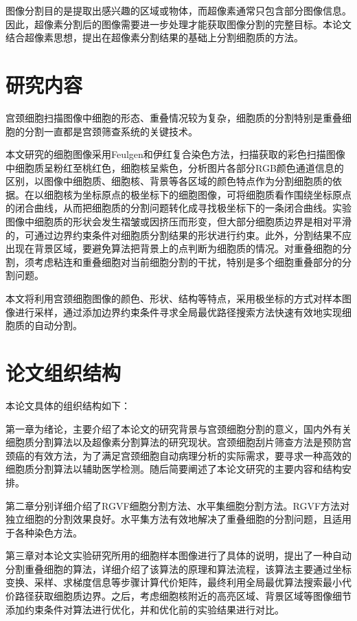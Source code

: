 \documentclass[nomlist,masters]{seuthesix}
\begin{document}
图像分割目的是提取出感兴趣的区域或物体，而超像素通常只包含部分图像信息。因此，超像素分割后的图像需要进一步处理才能获取图像分割的完整目标。本论文结合超像素思想，提出在超像素分割结果的基础上分割细胞质的方法。
\section{研究内容}
宫颈细胞扫描图像中细胞的形态、重叠情况较为复杂，细胞质的分割特别是重叠细胞的分割一直都是宫颈筛查系统的关键技术。

本文研究的细胞图像采用Feulgen和伊红复合染色方法，扫描获取的彩色扫描图像中细胞质呈粉红至桃红色，细胞核呈紫色，分析图片各部分RGB颜色通道信息的区别，以图像中细胞质、细胞核、背景等各区域的颜色特点作为分割细胞质的依据。在以细胞核为坐标原点的极坐标下的细胞图像，可将细胞质看作围绕坐标原点的闭合曲线，从而把细胞质的分割问题转化成寻找极坐标下的一条闭合曲线。实验图像中细胞质的形状会发生褶皱或因挤压而形变，但大部分细胞质边界是相对平滑的，可通过边界约束条件对细胞质分割结果的形状进行约束。此外，分割结果不应出现在背景区域，要避免算法把背景上的点判断为细胞质的情况。对重叠细胞的分割，须考虑粘连和重叠细胞对当前细胞分割的干扰，特别是多个细胞重叠部分的分割问题。

本文将利用宫颈细胞图像的颜色、形状、结构等特点，采用极坐标的方式对样本图像进行采样，通过添加边界约束条件寻求全局最优路径搜索方法快速有效地实现细胞质的自动分割。

\section{论文组织结构}
本论文具体的组织结构如下：

第一章为绪论，主要介绍了本论文的研究背景与宫颈细胞分割的意义，国内外有关细胞质分割算法以及超像素分割算法的研究现状。宫颈细胞刮片筛查方法是预防宫颈癌的有效方法，为了满足宫颈细胞自动病理分析的实际需求，要寻求一种高效的细胞质分割算法以辅助医学检测。随后简要阐述了本论文研究的主要内容和结构安排。

第二章分别详细介绍了RGVF细胞分割方法、水平集细胞分割方法。RGVF方法对独立细胞的分割效果良好。水平集方法有效地解决了重叠细胞的分割问题，且适用于各种染色方法。

第三章对本论文实验研究所用的细胞样本图像进行了具体的说明，提出了一种自动分割重叠细胞的算法，详细介绍了该算法的原理和算法流程，该算法主要通过坐标变换、采样、求梯度信息等步骤计算代价矩阵，最终利用全局最优算法搜索最小代价路径获取细胞质边界。之后，考虑细胞核附近的高亮区域、背景区域等图像细节添加约束条件对算法进行优化，并和优化前的实验结果进行对比。
\end{document}
